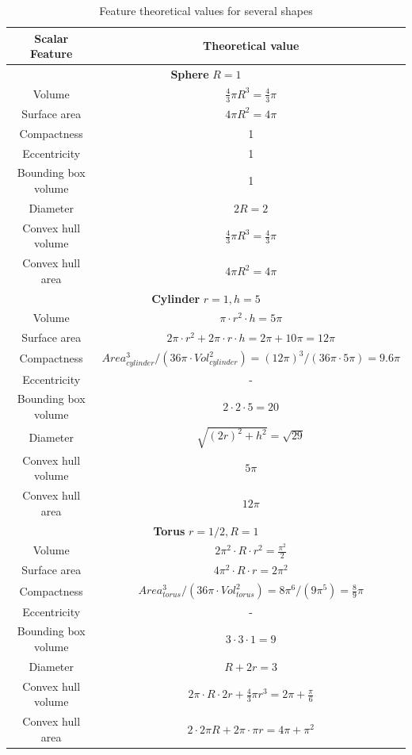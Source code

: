\begin{table}[ht]
    \centering
    \begin{tabular}{c|c}
        \textbf{Scalar Feature} & \textbf{Theoretical value} \\
        \hline
        \multicolumn{2}{c}{\textbf{Sphere} $R = 1$} \\
        \hline
        Volume & $\frac{4}{3} \pi R^3 = \frac{4}{3} \pi$ \\
        Surface area & $4 \pi R^2 = 4 \pi$\\
        Compactness & 1\\
        Eccentricity & 1\\
        Bounding box volume & 1\\
        Diameter & $2R = 2$\\
        Convex hull volume & $\frac{4}{3} \pi R^3 = \frac{4}{3} \pi$\\
        Convex hull area & $4 \pi R^2 = 4 \pi$\\
        
        \hline
        \multicolumn{2}{c}{\textbf{Cylinder} $r = 1, h = 5$} \\
        \hline
        Volume & $\pi \cdot r^2 \cdot h = 5 \pi$ \\
        Surface area & $2 \pi \cdot r^2 + 2 \pi \cdot r \cdot h = 2\pi + 10\pi = 12\pi$\\
        Compactness & $Area_{cylinder}^3 / (36\pi \cdot Vol_{cylinder}^2) = (12\pi)^3 / (36\pi \cdot 5\pi) = 9.6\pi$\\
        Eccentricity & -\\
        Bounding box volume & $2 \cdot 2 \cdot 5 = 20$\\
        Diameter & $\sqrt{(2r)^2 + h^2} = \sqrt{29}$\\
        Convex hull volume & $5\pi$\\
        Convex hull area & $12\pi$\\

        \hline
        \multicolumn{2}{c}{\textbf{Torus} $r = 1/2, R = 1$} \\
        \hline
        Volume & $2 \pi^2 \cdot R \cdot r^2 = \frac{\pi^2}{2}$ \\
        Surface area & $4 \pi^2 \cdot R \cdot r = 2 \pi^2$\\
        Compactness & $Area_{torus}^3 / (36\pi \cdot Vol_{torus}^2) = 8\pi^6 / (9\pi^5) = \frac{8}{9}\pi$\\
        Eccentricity & -\\
        Bounding box volume & $3 \cdot 3 \cdot 1 = 9$\\
        Diameter & $R + 2r = 3$\\
        Convex hull volume & $2\pi \cdot R \cdot 2r + \frac{4}{3}\pi r^3=  2\pi + \frac{\pi}{6}$\\
        Convex hull area & $2\cdot 2\pi R + 2\pi \cdot \pi r = 4\pi + \pi^2$\\
        
    \end{tabular}
    \caption{Feature theoretical values for several shapes}
    \label{tab:proof-global-features}
\end{table}


